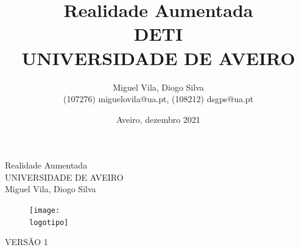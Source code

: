 \documentclass{report}
\begin{document}
\def\titulo{Realidade Aumentada}
\def\data{Aveiro, dezembro 2021}
\def\autores{Miguel Vila, Diogo Silva}
\def\autorescontactos{(107276) miguelovila@ua.pt, (108212) dsgps@ua.pt}
\def\versao{VERSÃO 1}
\def\departamento{DETI}
\def\empresa{UNIVERSIDADE DE AVEIRO}
\def\logotipo{ua.pdf}

\begin{titlepage}
\begin{center}
\vspace*{50mm}
{\Huge \titulo}\\ 
\vspace{10mm}
{\Large \empresa}\\
\vspace{10mm}
{\LARGE \autores}\\ 
\vspace{30mm}
\begin{figure}[h]
\center
\texttt{[image: \\logotipo]}
\end{figure}
\vspace{30mm}
\end{center}
\begin{flushright}
\versao
\end{flushright}
\end{titlepage}

\title{%
{\Huge\textbf{\titulo}}\\
{\Large \departamento\\ \empresa}
}
\author{
    \autores \\
    \autorescontactos
}
\date{\data}
\maketitle
{}
\end{document}
